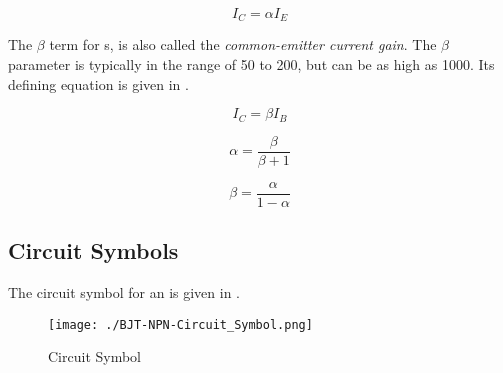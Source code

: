 \begin{equation}\label{eq:BJT_Alpha}
  I_{C} = \alpha I_{E}
\end{equation}

\begin{definition}\label{def:Common-Emitter_Current_Gain}\label{def:BJT-Beta}
  The $\beta$ term for s, is also called the \emph{common-emitter current gain}.
  The $\beta$ parameter is typically in the range of 50 to 200, but can be as high as 1000.
  Its defining equation is given in .
\end{definition}

\begin{equation}\label{eq:BJT_Beta}
  I_{C} = \beta I_{B}
\end{equation}

\begin{equation}\label{eq:BJT_Alpha-Beta_Terms}
  \alpha = \frac{\beta}{\beta + 1}
\end{equation}

\begin{equation}\label{eq:BJT_Beta-Alpha_Terms}
  \beta = \frac{\alpha}{1 - \alpha}
\end{equation}

\subsection{Circuit Symbols}\label{subsec:Circuit_Symbols}
The circuit symbol for an \NPNTransistor{}  is given in .

\begin{figure}[h!tbp]
  \centering
  \texttt{[image: ./BJT-NPN-Circuit\_Symbol.png]}
  \caption{ \NPNTransistor{} Circuit Symbol \parencite[p.~321]{sedraTextbook7}}
  \label{fig:BJT-NPN-Circuit_Symbol}
\end{figure}


